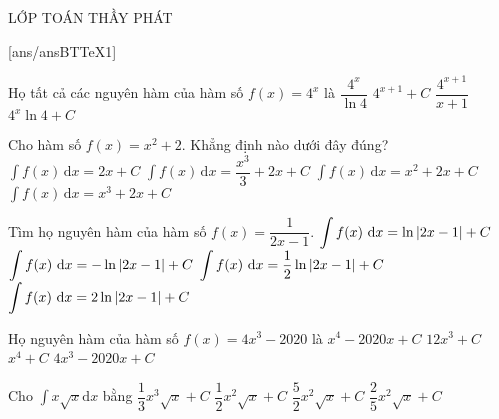 \begin{name}
{\tenchude}{\tendethi}{LỚP TOÁN THẦY PHÁT}{\thoigian}
\end{name}
[ans/ansBTTeX1]
\begin{ex}%
Họ tất cả các nguyên hàm của hàm số  $ f(x)=4^x $ là
\choice
{\True $ \dfrac{4^x}{\ln 4} $}
{$ 4^{x+1}+C $}
{$ \dfrac{4^{x+1}}{x+1} $}
{$ 4^x\ln 4+C $}
\end{ex}

\begin{ex}%
Cho hàm số $ f(x)=x^2+2$. Khẳng định nào dưới đây đúng?
\choice
{$\displaystyle\int{f(x)\,\mathrm{d}x=2x+C}$}
{\True $\displaystyle\int{f( x )\,\mathrm{d}x=\dfrac{x^3}{3}+2x+C}$}
{$\displaystyle\int{f( x )\,\mathrm{d}x=x^2+2x+C}$}
{$\displaystyle\int{f( x )\,\mathrm{d}x=x^3+2x+C}$}
\end{ex}

\begin{ex}%
Tìm họ nguyên hàm của hàm số $f(x)=\dfrac{1}{2x-1}$.
\choice
{$\displaystyle\int f(x){~\rm d}x=\ln\left|2x-1\right|+C$}
{\True $\displaystyle\int f(x){~\rm d}x=-\ln\left|2x-1\right|+C$}
{$\displaystyle\int f(x){~\rm d}x=\dfrac{1}{2}\ln\left|2x-1\right|+C$}
{$\displaystyle\int f(x){~\rm d}x=2\ln\left|2x-1\right|+C$}
\end{ex}

\begin{ex}%
Họ nguyên hàm của hàm số $f(x)=4x^3-2020$ là
\choice
{\True $x^4-2020x+C$}
{$12x^3+C$}
{$x^4+C$}
{$4x^3-2020x+C$}
\end{ex}

\begin{ex}%
Cho $\int x\sqrt{x} \mathrm{d}x$ bằng
\choice
{$\dfrac{1}{3}x^3 \sqrt{x}+C$}
{$\dfrac{1}{2}x^2\sqrt{x}+C$}
{$\dfrac{5}{2}x^2\sqrt{x}+C$}
{\True $\dfrac{2}{5}x^2\sqrt{x}+C$}
\end{ex}

